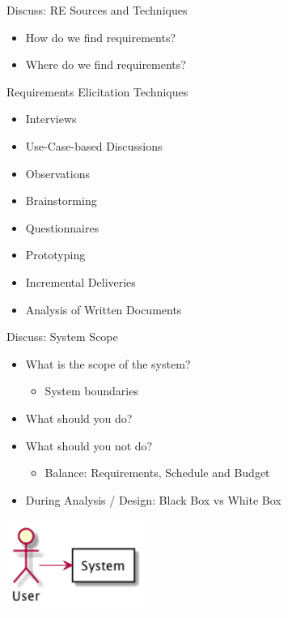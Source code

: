\documentclass[10pt,t,a4paper]{beamer}
\begin{document}
\begin{frame}[label=sec-1-4]{Discuss: RE Sources and Techniques}
\begin{itemize}
\item How do we find requirements?
\item Where do we find requirements?
\end{itemize}
\end{frame}
\begin{frame}[label=sec-1-5]{Requirements Elicitation Techniques}
\begin{itemize}
\item Interviews
\item Use-Case-based Discussions
\item Observations
\item Brainstorming
\item Questionnaires
\item Prototyping
\item Incremental Deliveries
\item Analysis of Written Documents
\end{itemize}
\end{frame}
\begin{frame}[label=sec-1-6]{Discuss: System Scope}
\begin{itemize}
\item What is the scope of the system?
\begin{itemize}
\item System boundaries
\end{itemize}
\item What should you do?
\item What should you not do?
\begin{itemize}
\item Balance: Requirements, Schedule and Budget
\end{itemize}
\item During Analysis / Design: Black Box vs White Box
\end{itemize}
\includegraphics[height=3cm]{FScope.png}
\end{frame}
\end{document}
